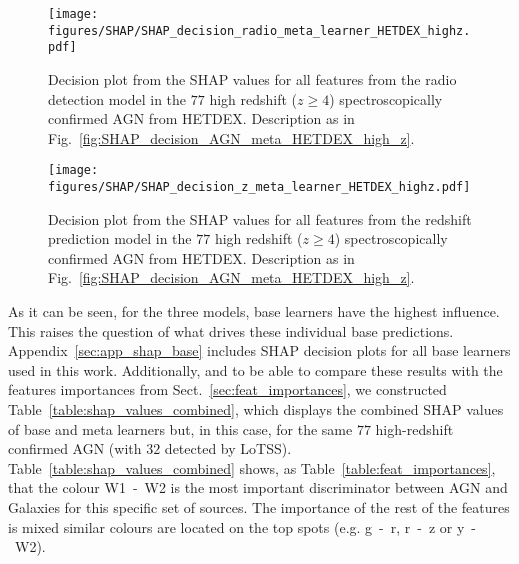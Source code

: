 \documentclass{aa}
\begin{document}
\begin{figure}
   \centering
   \texttt{[image: figures/SHAP/SHAP\_decision\_radio\_meta\_learner\_HETDEX\_highz.pdf]}
   \caption{Decision plot from the SHAP values for all features from the radio detection model in the $77$ high redshift ($z \geq 4$) spectroscopically confirmed AGN from HETDEX. Description as in Fig.~\ref{fig:SHAP_decision_AGN_meta_HETDEX_high_z}.}
   \label{fig:SHAP_decision_radio_meta_HETDEX_high_z}
\end{figure}

\begin{figure}
   \centering
   \texttt{[image: figures/SHAP/SHAP\_decision\_z\_meta\_learner\_HETDEX\_highz.pdf]}
   \caption{Decision plot from the SHAP values for all features from the redshift prediction model in the $77$ high redshift ($z \geq 4$) spectroscopically confirmed AGN from HETDEX. Description as in Fig.~\ref{fig:SHAP_decision_AGN_meta_HETDEX_high_z}.}
   \label{fig:SHAP_decision_z_meta_HETDEX_high_z}
\end{figure}

As it can be seen, for the three models, base learners have the highest influence. This raises the question of what drives these individual base predictions. Appendix~\ref{sec:app_shap_base} includes SHAP decision plots for all base learners used in this work. Additionally, and to be able to compare these results with the features importances from Sect.~\ref{sec:feat_importances}, we constructed Table~\ref{table:shap_values_combined}, which displays the combined SHAP values of base and meta learners but, in this case, for the same $77$ high-redshift confirmed AGN (with $32$ detected by LoTSS). Table~\ref{table:shap_values_combined} shows, as Table~\ref{table:feat_importances}, that the colour W1~-~W2 is the most important discriminator between AGN and Galaxies for this specific set of sources. The importance of the rest of the features is mixed similar colours are located on the top spots (e.g. g~-~r, r~-~z or y~-~W2).
\end{document}
